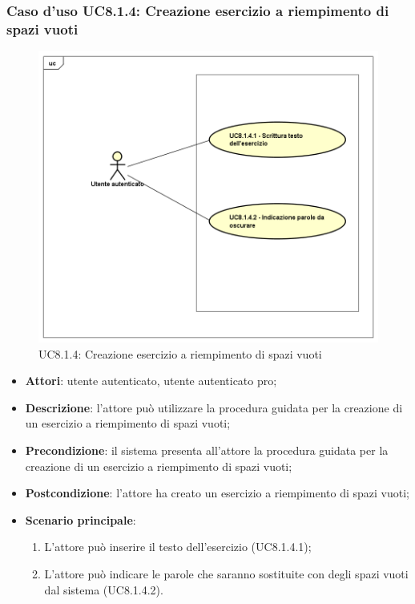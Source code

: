 \subsubsection{Caso d'uso UC8.1.4: Creazione esercizio a riempimento di spazi vuoti}
	\label{UC8.1.4}
	\begin{figure}[h]
		\centering
			\includegraphics[scale=0.45,keepaspectratio]{UML/UC8_1_4.png}
		\caption{UC8.1.4: Creazione esercizio a riempimento di spazi vuoti}
	\end{figure}
	\FloatBarrier
	\begin{itemize}
		\item
			\textbf{Attori}: utente autenticato, utente autenticato pro;
		\item		
			\textbf{Descrizione}: l'attore può utilizzare la procedura guidata per la creazione di un esercizio a riempimento di spazi vuoti;
		\item
			\textbf{Precondizione}: il sistema presenta all'attore la procedura guidata per la creazione di un esercizio a riempimento di spazi vuoti;
		\item
			\textbf{Postcondizione}: l'attore ha creato un esercizio a riempimento di spazi vuoti;
		\item
			\textbf{Scenario principale}:
	       		\begin{enumerate}
	       			\item
	       			L'attore può inserire il testo dell'esercizio (UC8.1.4.1);
	       			\item
	       			L'attore può indicare le parole che saranno sostituite con degli spazi vuoti dal sistema (UC8.1.4.2).
	 			\end{enumerate}
	\end{itemize}
	
